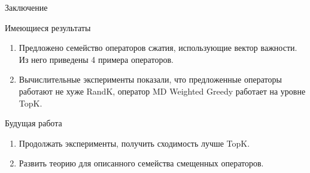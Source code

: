 \documentclass{beamer}
\begin{document}

\begin{frame}{Заключение}
    \begin{block}{Имеющиеся результаты}
    \begin{enumerate}
        \item Предложено семейство операторов сжатия, использующие вектор важности. Из него приведены 4 примера операторов.
        \item Вычислительные эксперименты показали, что предложенные операторы работают не хуже RandK, оператор MD Weighted Greedy работает на уровне TopK.
    \end{enumerate}
    \end{block}
    \begin{block}{Будущая работа}
    \begin{enumerate}
        \item Продолжать эксперименты, получить сходимость лучше TopK.
        \item Развить теорию для описанного семейства смещенных операторов.
    \end{enumerate}
    \end{block}

\end{frame}

\end{document}
